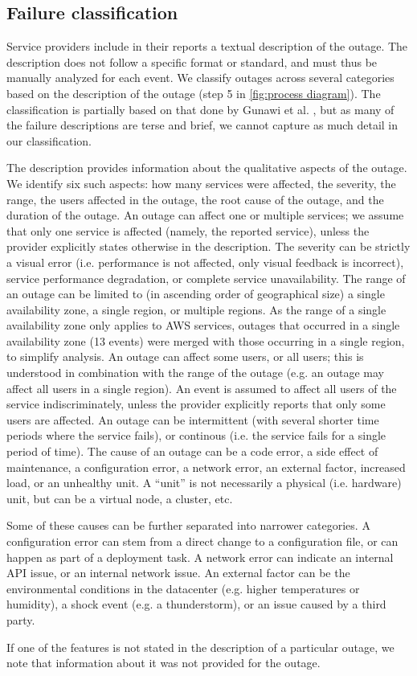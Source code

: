 \subsection{Failure classification}
Service providers include in their reports a textual description of the outage.
The description does not follow a specific format or standard, and must thus be manually analyzed for each event.
We classify outages across several categories based on the description of the outage (step 5 in \autoref{fig:process diagram}).
The classification is partially based on that done by Gunawi et al. \cite{gunawi2016, gunawi2014}, but as many of the failure descriptions are terse and brief, we cannot capture as much detail in our classification.

The description provides information about the qualitative aspects of the outage.
We identify six such aspects: how many services were affected, the severity, the range, the users affected in the outage, the root cause of the outage, and the duration of the outage.
An outage can affect one or multiple services; we assume that only one service is affected (namely, the reported service), unless the provider explicitly states otherwise in the description.
The severity can be strictly a visual error (i.e. performance is not affected, only visual feedback is incorrect), service performance degradation, or complete service unavailability.
The range of an outage can be limited to (in ascending order of geographical size) a single availability zone, a single region, or multiple regions.
As the range of a single availability zone only applies to AWS services, outages that occurred in a single availability zone (13 events) were merged with those occurring in a single region, to simplify analysis.
An outage can affect some users, or all users; this is understood in combination with the range of the outage (e.g. an outage may affect all users in a single region).
An event is assumed to affect all users of the service indiscriminately, unless the provider explicitly reports that only some users are affected.
An outage can be intermittent (with several shorter time periods where the service fails), or continous (i.e. the service fails for a single period of time).
The cause of an outage can be a code error, a side effect of maintenance, a configuration error, a network error, an external factor, increased load, or an unhealthy unit.
A ``unit'' is not necessarily a physical (i.e. hardware) unit, but can be a virtual node, a cluster, etc.

Some of these causes can be further separated into narrower categories.
A configuration error can stem from a direct change to a configuration file, or can happen as part of a deployment task.
A network error can indicate an internal API issue, or an internal network issue.
An external factor can be the environmental conditions in the datacenter (e.g. higher temperatures or humidity), a shock event (e.g. a thunderstorm), or an issue caused by a third party.

If one of the features is not stated in the description of a particular outage, we note that information about it was not provided for the outage.
